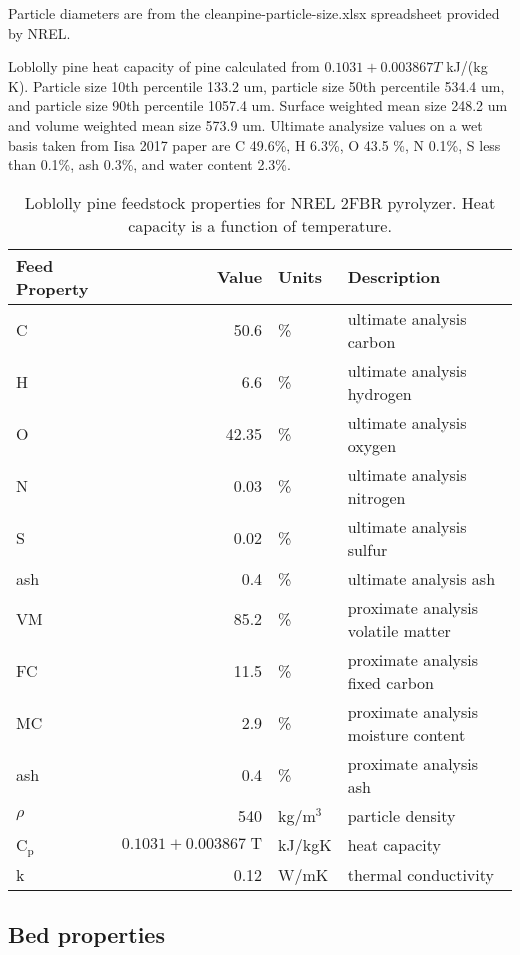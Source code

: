Particle diameters are from the cleanpine-particle-size.xlsx spreadsheet provided by NREL.

Loblolly pine heat capacity of pine calculated from $0.1031 + 0.003867 T$ kJ/(kg K). Particle size 10th percentile 133.2 um, particle size 50th percentile 534.4 um, and particle size 90th percentile 1057.4 um. Surface weighted mean size 248.2 um and volume weighted mean size 573.9 um. Ultimate analysize values on a wet basis taken from Iisa 2017 paper are C 49.6\%, H 6.3\%, O 43.5 \%, N 0.1\%, S less than 0.1\%, ash 0.3\%, and water content 2.3\%.

\begin{table}[H]
    \centering
    \caption{Loblolly pine feedstock properties for NREL 2FBR pyrolyzer. Heat capacity is a function of temperature.}
    \label{tab:feedstock}
    \begin{tabular}{lrll}
        \toprule
        Feed Property & Value & Units & Description \\
        \midrule
        C & 50.6 & \% & ultimate analysis carbon \\
        H & 6.6 & \% & ultimate analysis hydrogen \\
        O & 42.35 & \% & ultimate analysis oxygen \\
        N & 0.03 & \% & ultimate analysis nitrogen \\
        S & 0.02 & \% & ultimate analysis sulfur \\
        ash & 0.4 & \% & ultimate analysis ash \\
        VM & 85.2 & \% & proximate analysis volatile matter \\
        FC & 11.5 & \% & proximate analysis fixed carbon \\
        MC & 2.9 & \% & proximate analysis moisture content \\
        ash & 0.4 & \% & proximate analysis ash \\
        $\rho$ & 540 & kg/m$^3$ & particle density \\
        C$_\textrm{p}$ & $0.1031 + 0.003867\;\textrm{T}$ & kJ/kgK & heat capacity \\
        k & 0.12 & W/mK & thermal conductivity \\
        \bottomrule
    \end{tabular}
\end{table}

\subsection{Bed properties}

